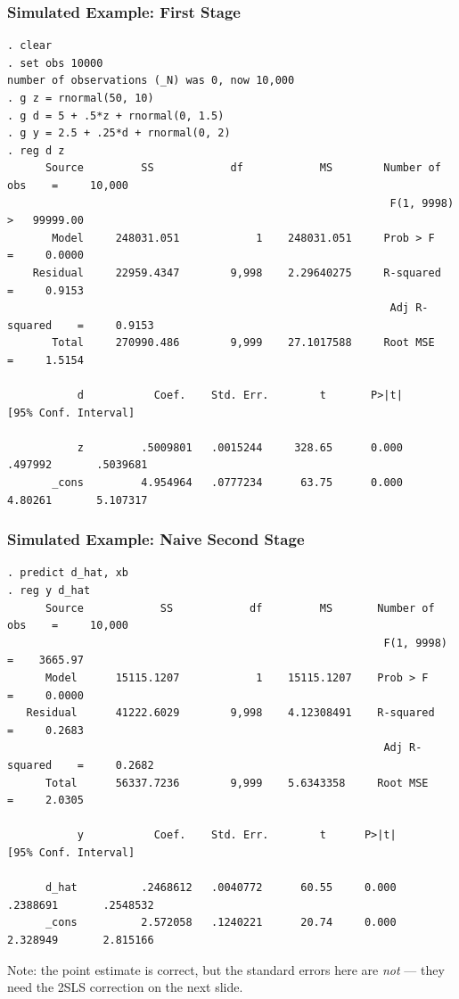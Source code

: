 \documentclass[11pt,aspectratio=169]{beamer}
\begin{document}
\begin{frame}[fragile]
  \frametitle{Simulated Example: First Stage}
{\scriptsize
\begin{verbatim}
. clear
. set obs 10000
number of observations (_N) was 0, now 10,000
. g z = rnormal(50, 10)
. g d = 5 + .5*z + rnormal(0, 1.5)
. g y = 2.5 + .25*d + rnormal(0, 2)
. reg d z
      Source         SS            df            MS        Number of obs    =     10,000
                                                            F(1, 9998)       >   99999.00
       Model     248031.051            1    248031.051     Prob > F         =     0.0000
    Residual     22959.4347        9,998    2.29640275     R-squared        =     0.9153
                                                            Adj R-squared    =     0.9153
       Total     270990.486        9,999    27.1017588     Root MSE         =     1.5154

           d           Coef.    Std. Err.        t       P>|t|       [95% Conf. Interval]

           z         .5009801   .0015244     328.65      0.000        .497992       .5039681
       _cons         4.954964   .0777234      63.75      0.000        4.80261       5.107317
\end{verbatim}
}
\end{frame}

\begin{frame}[fragile]
  \frametitle{Simulated Example: Naive Second Stage}
{\scriptsize
\begin{verbatim}
. predict d_hat, xb
. reg y d_hat
      Source            SS            df         MS       Number of obs    =     10,000
                                                           F(1, 9998)       =    3665.97
      Model      15115.1207            1    15115.1207    Prob > F         =     0.0000
   Residual      41222.6029        9,998    4.12308491    R-squared        =     0.2683
                                                           Adj R-squared    =     0.2682
      Total      56337.7236        9,999    5.6343358     Root MSE         =     2.0305

           y           Coef.    Std. Err.        t      P>|t|       [95% Conf. Interval]

      d_hat          .2468612   .0040772      60.55     0.000       .2388691       .2548532
      _cons          2.572058   .1240221      20.74     0.000       2.328949       2.815166
\end{verbatim}
}
\vspace{0.3em}
\footnotesize Note: the point estimate is correct, but the standard errors here are \emph{not} --- they need the 2SLS correction on the next slide.
\end{frame}
\end{document}
